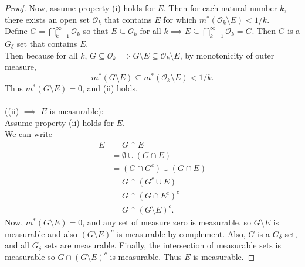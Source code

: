 \begin{proof}
	Now, assume property (i) holds for $E$. 
	Then for each natural number $k$, there exists an open set $\mathcal{O}_k$ that contains $E$ for which $m^*(\mathcal{O}_k\setminus E)<1/k$.
	\\Define $G=\bigcap_{k=1}^\infty\mathcal{O}_k$ so that $E\subseteq\mathcal{O}_k$ for all $k\implies E\subseteq\bigcap_{k=1}^\infty\mathcal{O}_k=G$.
	Then $G$ is a $G_\delta$ set that contains $E$.\\
	Then because for all $k$, $G\subseteq\mathcal{O}_k\implies G\setminus E\subseteq\mathcal{O}_k\setminus E$, by monotonicity of outer measure,
	\[
		m^*(G\setminus E)\subseteq m^*(\mathcal{O}_k\setminus E)<1/k.
	\]
	Thus $m^*(G\setminus E)=0$, and (ii) holds.\\
	\\((ii) $\implies$ $E$ is measurable):\\
	Assume property (ii) holds for $E$.\\
	We can write
	\begin{align*}
		E&=G\cap E\\
		&=\emptyset\cup(G\cap E)\\
		&=(G\cap G^c)\cup(G\cap E)\\
		&=G\cap (G^c\cup E)\\
		&=G\cap (G\cap E^c)^c\\
		&=G\cap (G\setminus E)^c.
	\end{align*}
	Now, $m^*(G\setminus E)=0$, and any set of measure zero is measurable, so $G\setminus E$ is measurable and also $(G\setminus E)^c$ is measurable by complement.
	Also, $G$ is a $G_\delta$ set, and all $G_\delta$ sets are measurable. Finally, the intersection of measurable sets is measurable so $G\cap (G\setminus E)^c$ is measurable.
	Thus $E$ is measurable.
\end{proof}

